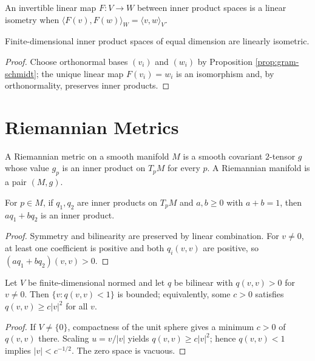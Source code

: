 An invertible linear map $F:V\to W$ between inner product spaces is a linear isometry when $\langle F(v),F(w)\rangle_W=\langle v,w\rangle_V$.

\begin{proposition}
\label{prop:inner-product-spaces-linearly-isometric}





Finite-dimensional inner product spaces of equal dimension are linearly isometric.
\end{proposition}
\begin{proof}

\sketch Choose orthonormal bases $(v_i)$ and $(w_i)$ by Proposition \ref{prop:gram-schmidt}; the unique linear map $F(v_i)=w_i$ is an isomorphism and, by orthonormality, preserves inner products.
\end{proof}

\section{Riemannian Metrics}

\begin{definition}
\label{def:riemannian-metric}




A Riemannian metric on a smooth manifold $M$ is a smooth covariant $2$-tensor $g$ whose value $g_p$ is an inner product on $T_pM$ for every $p$. A Riemannian manifold is a pair $(M,g)$.
\end{definition}

\begin{lemma}
\label{lem:convex-inner-products}




For $p\in M$, if $q_1,q_2$ are inner products on $T_pM$ and $a,b\ge0$ with $a+b=1$, then $a q_1+b q_2$ is an inner product.
\end{lemma}
\begin{proof}

\sketch Symmetry and bilinearity are preserved by linear combination. For $v\ne0$, at least one coefficient is positive and both $q_i(v,v)$ are positive, so $(a q_1+b q_2)(v,v)>0$.
\end{proof}

\begin{lemma}
\label{lem:posdef-coercive}




Let $V$ be finite-dimensional normed and let $q$ be bilinear with $q(v,v)>0$ for $v\ne0$. Then $\{v:q(v,v)<1\}$ is bounded; equivalently, some $c>0$ satisfies $q(v,v)\ge c|v|^2$ for all $v$.
\end{lemma}
\begin{proof}

\sketch If $V\ne\{0\}$, compactness of the unit sphere gives a minimum $c>0$ of $q(v,v)$ there. Scaling $u=v/|v|$ yields $q(v,v)\ge c|v|^2$; hence $q(v,v)<1$ implies $|v|<c^{-1/2}$. The zero space is vacuous.
\end{proof}

